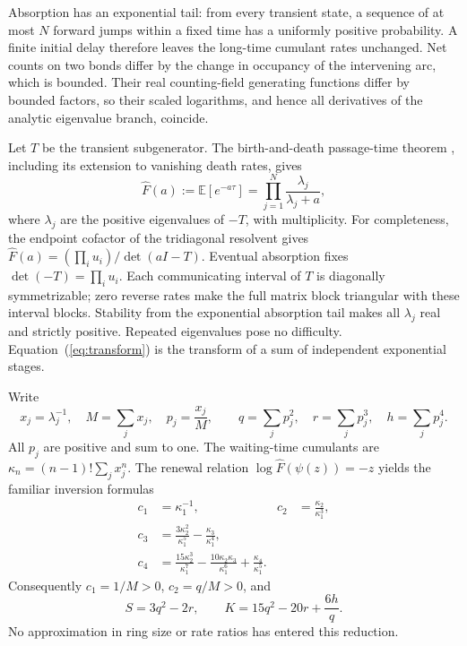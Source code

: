\documentclass[aps,pre,preprint,superscriptaddress,nofootinbib]{revtex4-2}
\begin{document}
Absorption has an exponential tail: from every transient state, a sequence of at most $N$ forward jumps within a fixed time has a uniformly positive probability. A finite initial delay therefore leaves the long-time cumulant rates unchanged. Net counts on two bonds differ by the change in occupancy of the intervening arc, which is bounded. Their real counting-field generating functions differ by bounded factors, so their scaled logarithms, and hence all derivatives of the analytic eigenvalue branch, coincide.

Let $T$ be the transient subgenerator. The birth-and-death passage-time theorem \cite{Fill2009}, including its extension to vanishing death rates, gives
\begin{equation}
 \widehat F(a):=\mathbb E[e^{-a\tau}]
 =\prod_{j=1}^N\frac{\lambda_j}{\lambda_j+a},
 \label{eq:transform}
\end{equation}
where $\lambda_j$ are the positive eigenvalues of $-T$, with multiplicity.
For completeness, the endpoint cofactor of the tridiagonal resolvent gives $\widehat F(a)=(\prod_i u_i)/\det(aI-T)$.
Eventual absorption fixes $\det(-T)=\prod_i u_i$.
Each communicating interval of $T$ is diagonally symmetrizable; zero reverse rates make the full matrix block triangular with these interval blocks. Stability from the exponential absorption tail makes all $\lambda_j$ real and strictly positive. Repeated eigenvalues pose no difficulty. Equation~(\ref{eq:transform}) is the transform of a sum of independent exponential stages.

Write
\begin{equation}
 x_j=\lambda_j^{-1},\quad M=\sum_jx_j,\quad
 p_j=\frac{x_j}{M},\qquad
 q=\sum_jp_j^2,\quad r=\sum_jp_j^3,\quad h=\sum_jp_j^4.
 \label{eq:weights}
\end{equation}
All $p_j$ are positive and sum to one. The waiting-time cumulants are $\kappa_n=(n-1)!\sum_jx_j^n$.
The renewal relation $\log\widehat F(\psi(z))=-z$ yields the familiar inversion formulas \cite{Ptaszynski2022}
\begin{align}
 c_1&=\kappa_1^{-1},&
 c_2&=\frac{\kappa_2}{\kappa_1^3},\nonumber\\
 c_3&=\frac{3\kappa_2^2}{\kappa_1^5}
       -\frac{\kappa_3}{\kappa_1^4},\nonumber\\
 c_4&=\frac{15\kappa_2^3}{\kappa_1^7}
       -\frac{10\kappa_2\kappa_3}{\kappa_1^6}
       +\frac{\kappa_4}{\kappa_1^5}.
\end{align}
Consequently $c_1=1/M>0$, $c_2=q/M>0$, and
\begin{equation}
 S=3q^2-2r,\qquad K=15q^2-20r+\frac{6h}{q}.
 \label{eq:ratios}
\end{equation}
No approximation in ring size or rate ratios has entered this reduction.
\end{document}
